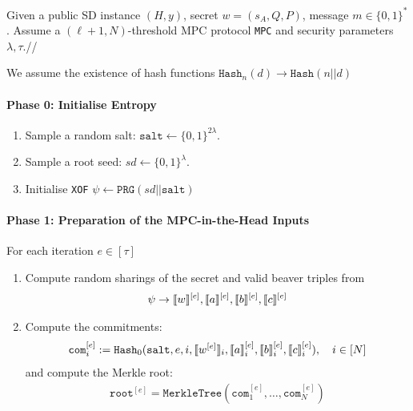 \documentclass[11pt]{report}
\theoremstyle{definition}
\theoremstyle{plain}
\begin{document}
\begin{protocol}
  \setlength{\parindent}{0pt}
  \setlength{\parskip}{5pt}
  \titlespacing*{\paragraph}{0pt}{1pt}{1em}
  Given a public SD instance $(H, y)$, secret $w = (s_A, Q, P)$, message $m \in \{0,1\}^*$. Assume a $(\ell + 1, N)$-threshold MPC protocol \texttt{MPC} and security parameters $\lambda, \tau$.//

  We assume the existence of hash functions $\texttt{Hash}_n(d) \rightarrow \texttt{Hash}(n || d)$

  \paragraph{Phase 0: Initialise Entropy}

  \begin{enumerate}[itemsep=0pt, topsep=0pt, parsep=0pt]
    \item Sample a random salt: $\texttt{salt} \leftarrow \{0, 1\}^{2\lambda}$.
    \item Sample a root seed: $sd \leftarrow \{0, 1\}^{\lambda}$.
    \item Initialise \texttt{XOF} $\psi \leftarrow \texttt{PRG}(sd || \texttt{salt})$
  \end{enumerate}
  \paragraph{Phase 1: Preparation of the MPC-in-the-Head Inputs}

  For each iteration $e \in [\tau]$

  \begin{enumerate}[itemsep=0pt, topsep=0pt, parsep=0pt]
    \item Compute random sharings of the secret and valid beaver triples from
    \begin{align*}
      \psi \rightarrow \llbracket w \rrbracket^{[e]}, \llbracket a \rrbracket^{[e]}, \llbracket b \rrbracket^{[e]}, \llbracket c \rrbracket^{[e]}
    \end{align*}
    \item Compute the commitments:
          \begin{align*}
            \texttt{com}_i^{[e]} := \texttt{Hash}_0(\texttt{salt}, e, i, \llbracket w^{[e]} \rrbracket_i, \llbracket a \rrbracket^{[e]}_i, \llbracket b \rrbracket^{[e]}_i, \llbracket c \rrbracket^{[e]}_i), \quad i \in [N]
          \end{align*}
          and compute the Merkle root:
          \begin{align*}
            \texttt{root}^{[e]} = \texttt{MerkleTree}(\texttt{com}_1^{[e]}, \ldots, \texttt{com}_N^{[e]})
          \end{align*}
  \end{enumerate}


\end{protocol}
\end{document}
